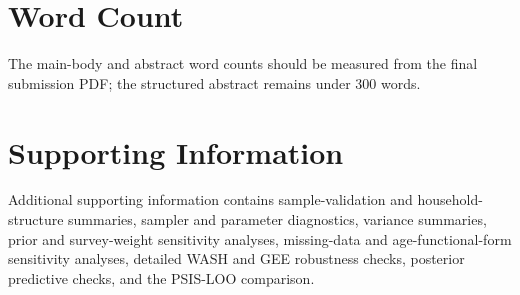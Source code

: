 \documentclass[11pt]{article}
\begin{document}
\section*{Word Count}
The main-body and abstract word counts should be measured from the final submission PDF; the structured abstract remains under 300 words.

\section*{Supporting Information}
Additional supporting information contains sample-validation and household-structure summaries, sampler and parameter diagnostics, variance summaries, prior and survey-weight sensitivity analyses, missing-data and age-functional-form sensitivity analyses, detailed WASH and GEE robustness checks, posterior predictive checks, and the PSIS-LOO comparison.



\end{document}
